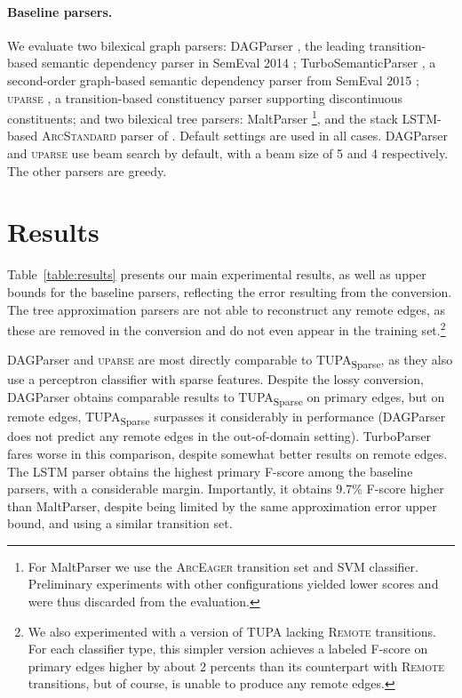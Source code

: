 \documentclass[11pt,a4paper]{article}
\newcommand{\parser}[1]{TUPA\textsubscript{#1}}
\newcommand{\tabref}[1]{Table~\ref{#1}}
\begin{document}
\paragraph{Baseline parsers.}
We evaluate two bilexical graph parsers:
DAGParser \cite{ribeyre-villemontedelaclergerie-seddah:2014:SemEval}, the leading 
transition-based semantic dependency parser in SemEval 2014 \cite{oepen2014semeval};
TurboSemanticParser \cite{almeida-martins:2015:SemEval},
a second-order graph-based semantic dependency parser from SemEval 2015 
\cite{oepen2015semeval};
\textsc{uparse} \cite{maier-lichte:2016:DiscoNLP},
a transition-based constituency parser supporting discontinuous constituents;
and two bilexical tree parsers:
MaltParser \cite{nivre2007maltparser}\footnote{For
MaltParser we use the \textsc{ArcEager} transition set and SVM classifier.
Preliminary experiments with other configurations yielded lower scores and
were thus discarded from the evaluation.},
and the stack LSTM-based \textsc{ArcStandard} parser of \citet{dyer2015transition}.
Default settings are used in all cases.
DAGParser and \textsc{uparse} use beam search by default, with a beam size of 5 and 4
respectively. The other parsers are greedy.



\section{Results}\label{sec:results}

\tabref{table:results} presents our main experimental results, as well as
upper bounds for the baseline parsers,
reflecting the error resulting from the conversion.
The tree approximation parsers are not able to reconstruct any remote edges,
as these are removed in the conversion and do not even appear in the training set.\footnote{We
also experimented with a version of \parser{} lacking
\textsc{Remote} transitions. For each classifier type, this simpler version achieves a labeled
F-score on primary edges higher by about 2 percents than its counterpart with \textsc{Remote}
transitions, but of course, is unable to produce any remote edges.}

DAGParser and \textsc{uparse} are most directly comparable to
\parser{Sparse}, as they also use a perceptron classifier with sparse features.
Despite the lossy conversion, DAGParser obtains comparable results to
\parser{Sparse} on primary edges, but on remote edges, \parser{Sparse}
surpasses it considerably in performance
(DAGParser does not predict any remote edges in the out-of-domain setting).
TurboParser fares worse in this comparison, despite somewhat better results on
remote edges.
The LSTM parser obtains the highest primary F-score among the baseline parsers,
with a considerable margin. Importantly, it obtains 9.7\% F-score
higher than MaltParser,
despite being limited by the same approximation error upper bound,
and using a similar transition set.
\end{document}

